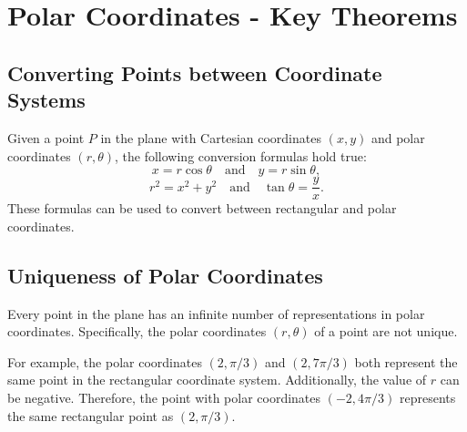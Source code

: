 \documentclass{article}
\begin{document}
\renewcommand{\familydefault}{\rmdefault}



\newpage
\setcounter{page}{0}
\tableofcontents
{}
\newpage



\section*{Polar Coordinates - Key Theorems}

\subsection*{Converting Points between Coordinate Systems}
\begin{theorembox}
    Given a point \( P \) in the plane with Cartesian coordinates \( (x,y) \) and polar coordinates \( (r,\theta) \), the following conversion formulas hold true:
    \[
    x = r \cos\theta \quad \text{and} \quad y = r \sin\theta,
    \]
    \[
    r^2 = x^2 + y^2 \quad \text{and} \quad \tan\theta = \frac{y}{x}.
    \]
    These formulas can be used to convert between rectangular and polar coordinates.
\end{theorembox}

\subsection*{Uniqueness of Polar Coordinates}
\begin{propositionbox}
    Every point in the plane has an infinite number of representations in polar coordinates. Specifically, the polar coordinates \( (r, \theta) \) of a point are not unique.
    
    \begin{remarkbox}
        For example, the polar coordinates \( (2, \pi/3) \) and \( (2, 7\pi/3) \) both represent the same point in the rectangular coordinate system. Additionally, the value of \( r \) can be negative. Therefore, the point with polar coordinates \( (-2, 4\pi/3) \) represents the same rectangular point as \( (2, \pi/3) \).
    \end{remarkbox}
\end{propositionbox}
\end{document}
